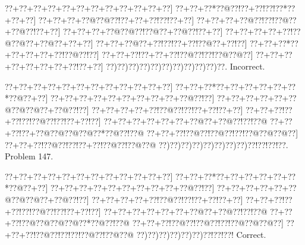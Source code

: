 \documentclass[a5paper]{article}
\begin{document}
\begin{center}
{\goo
\0??+\0??+\0??+\0??+\0??+\0??+\0??+\0??+\0??+\0??+\0??+\0??]
\0??+\0??+\0??*\0??@\0??!\0??+\0??!\0??!\0??*\0??+\0??+\0??]
\0??+\0??+\0??+\0??@\0??@\0??!\0??+\0??+\0??!\0??!\0??+\0??]
\0??+\0??+\0??+\0??@\0??!\0??!\0??@\0??+\0??@\0??!\0??+\0??]
\0??+\0??+\0??+\0??@\0??@\0??!\0??@\0??+\0??@\0??!\0??+\0??]
\0??+\0??+\0??+\0??+\0??!\0??@\0??@\0??+\0??@\0??+\0??+\0??]
\0??+\0??+\0??@\0??+\0??!\0??!\0??+\0??!\0??@\0??+\0??!\0??]
\0??+\0??+\0??*\0??+\0??+\0??+\0??+\0??!\0??@\0??!\0??]
\0??+\0??+\0??!\0??+\0??+\0??!\0??@\0??!\0??!\0??@\0??@\0??]
\0??+\0??+\0??+\0??+\0??+\0??+\0??+\0??!\0??+\0??]
\0??)\0??)\0??)\0??)\0??)\0??)\0??)\0??)\0??)\0??)\0??.
}
Incorrect. 

\end{center}
\newpage
\begin{center}
{\goo
\0??+\0??+\0??+\0??+\0??+\0??+\0??+\0??+\0??+\0??+\0??+\0??]
\0??+\0??+\0??*\0??+\0??+\0??+\0??+\0??+\0??*\0??@\0??+\0??]
\0??+\0??+\0??+\0??+\0??+\0??+\0??+\0??+\0??+\0??@\0??!\0??]
\0??+\0??+\0??+\0??+\0??+\0??@\0??@\0??@\0??+\0??@\0??!\0??]
\0??+\0??+\0??+\0??+\0??!\0??@\0??!\0??!\0??+\0??!\0??+\0??]
\0??+\0??+\0??!\0??+\0??!\0??!\0??@\0??!\0??!\0??+\0??!\0??]
\0??+\0??+\0??+\0??+\0??+\0??+\0??@\0??+\0??@\0??!\0??!\0??@
\0??+\0??+\0??!\0??+\0??@\0??@\0??@\0??@\0??*\0??@\0??!\0??@
\0??+\0??+\0??!\0??@\0??!\0??@\0??!\0??!\0??@\0??@\0??@\0??]
\0??+\0??+\0??!\0??@\0??!\0??!\0??+\0??!\0??@\0??!\0??@\0??@
\0??)\0??)\0??)\0??)\0??)\0??)\0??)\0??)\0??!\0??!\0??!\0??.
}
Problem 147.

\end{center}
\begin{center}
{\goo
\0??+\0??+\0??+\0??+\0??+\0??+\0??+\0??+\0??+\0??+\0??+\0??]
\0??+\0??+\0??*\0??+\0??+\0??+\0??+\0??+\0??*\0??@\0??+\0??]
\0??+\0??+\0??+\0??+\0??+\0??+\0??+\0??+\0??+\0??@\0??!\0??]
\0??+\0??+\0??+\0??+\0??+\0??@\0??@\0??@\0??+\0??@\0??!\0??]
\0??+\0??+\0??+\0??+\0??!\0??@\0??!\0??!\0??+\0??!\0??+\0??]
\0??+\0??+\0??!\0??+\0??!\0??!\0??@\0??!\0??!\0??+\0??!\0??]
\0??+\0??+\0??+\0??+\0??+\0??+\0??@\0??+\0??@\0??!\0??!\0??@
\0??+\0??+\0??!\0??@\0??@\0??@\0??@\0??*\0??@\0??!\0??@
\0??+\0??+\0??!\0??@\0??!\0??@\0??!\0??!\0??@\0??@\0??@\0??]
\0??+\0??+\0??!\0??@\0??!\0??!\0??!\0??@\0??!\0??@\0??@
\0??)\0??)\0??)\0??)\0??)\0??)\0??!\0??!\0??!
}
Correct. 

\end{center}
\end{document}
